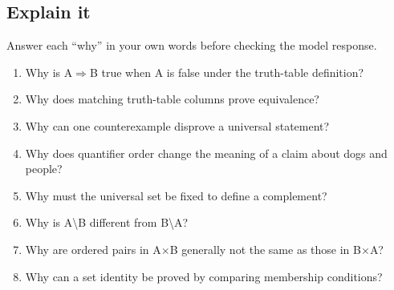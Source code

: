\documentclass[11pt]{article}
\begin{document}
\begin{keepsection}
\section{Explain it}

Answer each “why” in your own words before checking the model response.

\begin{enumerate}
\item Why is A\ensuremath{\Rightarrow}B true when A is false under the truth-table definition?
\item Why does matching truth-table columns prove equivalence?
\item Why can one counterexample disprove a universal statement?
\item Why does quantifier order change the meaning of a claim about dogs and people?
\item Why must the universal set be fixed to define a complement?
\item Why is A\textbackslash{}B different from B\textbackslash{}A?
\item Why are ordered pairs in A\ensuremath{\times}B generally not the same as those in B\ensuremath{\times}A?
\item Why can a set identity be proved by comparing membership conditions?
\end{enumerate}

\end{keepsection}

\clearpage
\end{document}
